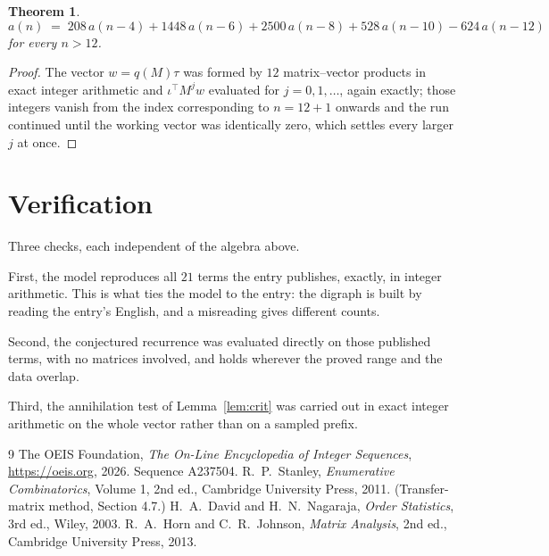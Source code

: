 \documentclass[11pt,a4paper]{article}
\theoremstyle{plain}
\newtheorem{theorem}{Theorem}
\theoremstyle{definition}
\begin{document}
\begin{theorem}
\[
a(n)\;=\;208\,a(n-4) + 1448\,a(n-6) + 2500\,a(n-8) + 528\,a(n-10) - 624\,a(n-12)
\]
for every $n>12$.
\end{theorem}

\begin{proof}
The vector $w=q(M)\tau$ was formed by $12$ matrix--vector products in exact integer
arithmetic and $\iota^{\!\top}M^{j}w$ evaluated for $j=0,1,\dots$, again exactly; those
integers vanish from the index corresponding to $n=12+1$ onwards and the run continued
until the working vector was identically zero, which settles every larger $j$ at once.
\end{proof}

\section{Verification}

Three checks, each independent of the algebra above.

First, the model reproduces all $21$ terms the entry publishes, exactly, in integer
arithmetic. This is what ties the model to the entry: the digraph is built by reading the
entry's English, and a misreading gives different counts.

Second, the conjectured recurrence was evaluated directly on those published terms, with no
matrices involved, and holds wherever the proved range and the data overlap.

Third, the annihilation test of Lemma~\ref{lem:crit} was carried out in exact integer
arithmetic on the whole vector rather than on a sampled prefix.

\begin{thebibliography}{9}
 The OEIS Foundation, \emph{The On-Line Encyclopedia of Integer
Sequences}, \url{https://oeis.org}, 2026. Sequence A237504.
 R.~P.~Stanley, \emph{Enumerative Combinatorics}, Volume 1, 2nd ed.,
Cambridge University Press, 2011. (Transfer-matrix method, Section 4.7.)
 H.~A.~David and H.~N.~Nagaraja, \emph{Order Statistics}, 3rd ed., Wiley,
2003.
 R.~A.~Horn and C.~R.~Johnson, \emph{Matrix Analysis}, 2nd ed., Cambridge
University Press, 2013.
\end{thebibliography}
\end{document}
